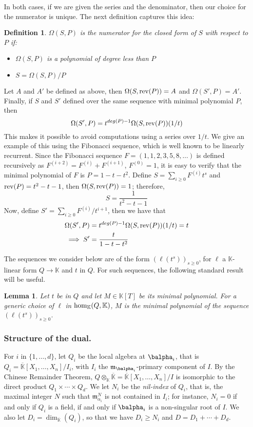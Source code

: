 \documentclass[12pt]{article}
\newtheorem{Lemma}{Lemma}
\def\K {\ensuremath{\mathbb{K}}}
\def\Kbar {{\ensuremath{\overline{\mathbb{K}}}}}
\def\D {\ensuremath{D}}
\def\m {\ensuremath{\mathfrak{m}}}
\newtheorem{definition}{Definition}
\def\K{\mathbb{K}}
\begin{document}
In both cases, if we are given the series and the denominator, then our 
choice for the numerator is unique. The next definition captures this idea:
\begin{definition}
	\label{def:omega}
	$\Omega(S,P)$ is the numerator for the closed form of $S$ with respect
	to $P$ if:
	\begin{itemize}
		\item $\Omega(S,P)$ is a polynomial of degree less than $P$
		\item $S = \Omega(S,P)/P$
	\end{itemize}
\end{definition}
\noindent Let $A$ and $A'$ be defined as above, then 
$\Omega(S,{\rm rev}(P)) = A$ and $\Omega(S',P) = A'$. Finally, 
if $S$ and $S'$ defined over the same sequence with 
minimal polynomial $P$, then
$$\Omega(S',P) = t^{deg(P) - 1} \Omega(S,{\rm rev}(P) )(1/t)$$
\noindent This makes it possible to avoid computations using a series
over $1/t$. We give an example of this using
the Fibonacci sequence, which is well known to be linearly recurrent. Since 
the Fibonacci sequence $F = (1,1,2,3,5,8,\dots)$ is defined
recursively as $F^{(i+2)} = F^{(i)} + F^{(i+1)}$, $F^{(0)} = 1$, it is
easy to verify that the minimal polynomial of $F$ is $P = 1-t-t^2$.
Define $S = \sum_{i\ge 0} F^{(i)} t^s$ and ${\rm rev}(P) = t^2-t-1$, then
$\Omega(S,{\rm rev}(P)) = 1$; therefore,
$$S = \frac{1}{t^2-t-1}$$
\noindent Now, define $S' = \sum_{i\ge0} F^{(i)}/t^{i+1}$, then we have that
\begin{align*}
\Omega(S',P)& = t^{deg(P)-1}\Omega(S,{\rm rev}(P))(1/t) = t\\
\implies S' &= \frac{t}{1-t-t^2}
\end{align*}

The sequences we consider below are of the form $(\ell(t^s))_{s \ge
	0}$, for $\ell$ a $\K$-linear form $Q \to \K$ and $t$ in $Q$. For such
sequences, the following standard result will be useful.
\begin{Lemma}\label{lemma:minpoly}
	Let $t$ be in $Q$ and let $M \in \K[T]$ be its minimal
	polynomial. For a generic choice of $\ell$ in ${\rm hom}_\K(Q,\K)$,
	$M$ is the minimal polynomial of the sequence $(\ell(t^s))_{s \ge
		0}$.
\end{Lemma}





\subsubsection{Structure of the dual.}
For $i$ in $\{1,\dots,d\}$, let $Q_i$ be the local algebra at
$\balpha_i$, that is $Q_i=\Kbar[X_1,\dots,X_n]/I_i$, with $I_i$ the
$\m_{\balpha_i}$-primary component of $I$. By the Chinese Remainder
Theorem, $Q\otimes_\K \Kbar=\Kbar[X_1,\dots,X_n]/I$ is isomorphic to
the direct product $Q_1\times \cdots \times Q_d$.  We let $N_i$ be the
{\em nil-index} of $Q_i$, that is, the maximal integer $N$ such that
$\m_{\alpha_i}^N$ is not contained in $I_i$; for instance, $N_i=0$ if
and only if $Q_i$ is a field, if and only if $\balpha_i$ is a
non-singular root of $I$. We also let
$\D_i=\dim_\Kbar(Q_i)$, so that we have $D_i \ge N_i$ and $\D=\D_1 + \cdots + \D_d$.
\end{document}
